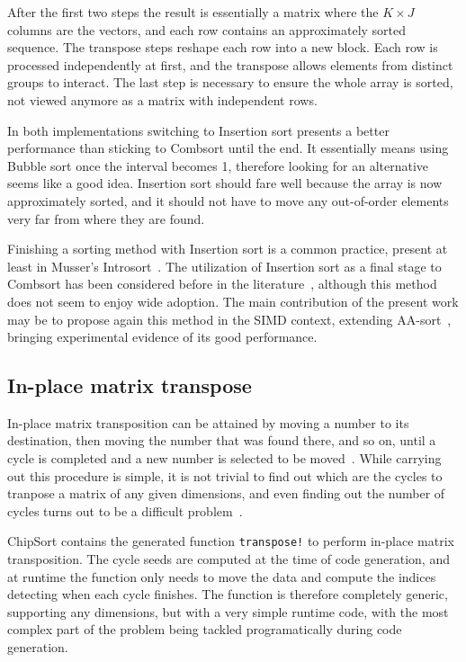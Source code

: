 \documentclass{juliacon}
\begin{document}
After the first two steps the result is essentially a matrix where the $K\times J$ columns are the vectors, and each row contains an approximately sorted sequence. The transpose steps reshape each row into a new block. Each row is processed independently at first, and the transpose allows elements from distinct groups to interact. The last step is necessary to ensure the whole array is sorted, not viewed anymore as a matrix with independent rows.

In both implementations switching to Insertion sort presents a better performance than sticking to Combsort until the end. It essentially means using Bubble sort once the interval becomes 1, therefore looking for an alternative seems like a good idea. Insertion sort should fare well because the array is now approximately sorted, and it should not have to move any out-of-order elements very far from where they are found.

Finishing a sorting method with Insertion sort is a common practice, present at least in Musser's Introsort~\cite{musser1997introspective}. The utilization of Insertion sort as a final stage to Combsort has been considered before in the literature~\cite{combwiki,INCERPI198737}, although this method does not seem to enjoy wide adoption. The main contribution of the present work may be to propose again this method in the SIMD context, extending AA-sort~\cite{DBLP:conf/IEEEpact/InoueMKN07,DBLP:journals/pvldb/InoueT15}, bringing experimental evidence of its good performance.

\subsection{In-place matrix transpose}
%
In-place matrix transposition can be attained by moving a number to its destination, then moving the number that was found there, and so on, until a cycle is completed and a new number is selected to be moved~\cite{10.1093/comjnl/2.1.47}. While carrying out this procedure is simple, it is not trivial to find out which are the cycles to tranpose a matrix of any given dimensions, and even finding out the number of cycles turns out to be a difficult problem~\cite[Sec. 1.3.3, Ex. 12]{DBLP:books/lib/Knuth97}.

ChipSort contains the generated function {\tt transpose!} to perform in-place matrix transposition. The cycle seeds are computed at the time of code generation, and at runtime the function only needs to move the data and compute the indices detecting when each cycle finishes. The function is therefore completely generic, supporting any dimensions, but with a very simple runtime code, with the most complex part of the problem being tackled programatically during code generation.
\end{document}
